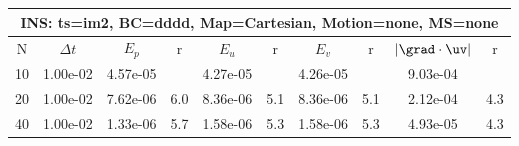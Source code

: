
\begin{tabular}{|c|c|c|c|c|c|c|c|c|c|} \hline
 \multicolumn{10}{|c|}{INS: ts=im2, BC=dddd, Map=Cartesian, Motion=none, MS=none } \\ \hline 
     N  &   $\Delta t$ & $E_p$   &  r  &   $E_u$   &   r    &   $E_v$   & r   &  $|\grad\cdot\uv|$  & r   \\ \hline 
  10   &  1.00e-02  &   4.57e-05  &        &   4.27e-05  &        &   4.26e-05  &        &   9.03e-04  &        \\ 
  20   &  1.00e-02  &   7.62e-06  & 6.0  &   8.36e-06  & 5.1  &   8.36e-06  & 5.1  &   2.12e-04  & 4.3  \\ 
  40   &  1.00e-02  &   1.33e-06  & 5.7  &   1.58e-06  & 5.3  &   1.58e-06  & 5.3  &   4.93e-05  & 4.3  \\ 
 \hline 
\end{tabular}
